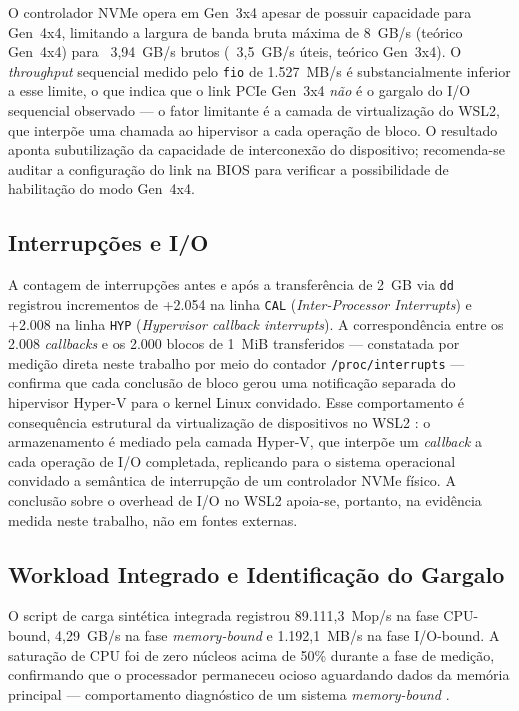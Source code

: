 \documentclass[12pt]{article}
\begin{document}
O controlador NVMe opera em Gen~3x4 apesar de possuir capacidade para Gen~4x4, limitando a largura de banda bruta máxima de 8~GB/s (teórico Gen~4x4) para ~3,94~GB/s brutos (~3,5~GB/s úteis, teórico Gen~3x4). O \textit{throughput} sequencial medido pelo \texttt{fio} de 1.527~MB/s é substancialmente inferior a esse limite, o que indica que o link PCIe Gen~3x4 \emph{não} é o gargalo do I/O sequencial observado --- o fator limitante é a camada de virtualização do WSL2, que interpõe uma chamada ao hipervisor a cada operação de bloco. O resultado aponta subutilização da capacidade de interconexão do dispositivo; recomenda-se auditar a configuração do link na BIOS para verificar a possibilidade de habilitação do modo Gen~4x4.

\subsection{Interrupções e I/O}

A contagem de interrupções antes e após a transferência de 2~GB via \texttt{dd} registrou incrementos de +2.054 na linha \texttt{CAL} (\textit{Inter-Processor Interrupts}) e +2.008 na linha \texttt{HYP} (\textit{Hypervisor callback interrupts}). A correspondência entre os 2.008 \textit{callbacks} e os 2.000 blocos de 1~MiB transferidos --- constatada por medição direta neste trabalho por meio do contador \texttt{/proc/interrupts} \cite{love2010linux} --- confirma que cada conclusão de bloco gerou uma notificação separada do hipervisor Hyper-V para o kernel Linux convidado. Esse comportamento é consequência estrutural da virtualização de dispositivos no WSL2 \cite{tanenbaum2015}: o armazenamento é mediado pela camada Hyper-V, que interpõe um \textit{callback} a cada operação de I/O completada, replicando para o sistema operacional convidado a semântica de interrupção de um controlador NVMe físico. A conclusão sobre o overhead de I/O no WSL2 apoia-se, portanto, na evidência medida neste trabalho, não em fontes externas.

\subsection{Workload Integrado e Identificação do Gargalo}

O script de carga sintética integrada registrou 89.111,3~Mop/s na fase CPU-bound, 4,29~GB/s na fase \textit{memory-bound} e 1.192,1~MB/s na fase I/O-bound. A saturação de CPU foi de zero núcleos acima de 50\% durante a fase de medição, confirmando que o processador permaneceu ocioso aguardando dados da memória principal --- comportamento diagnóstico de um sistema \textit{memory-bound} \cite{williams2009}.
\end{document}

